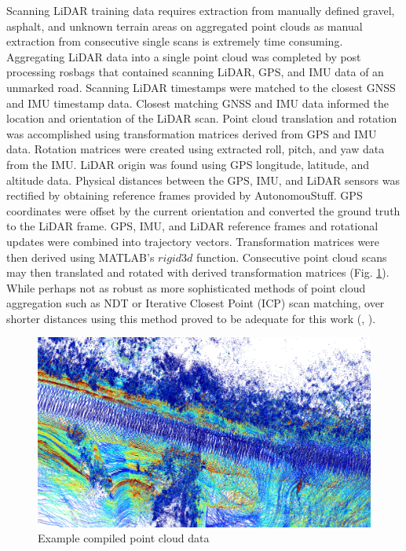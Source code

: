 \documentclass[numbered,pdftex]{ohio-etd}
\begin{document}
{{		{Scanning LiDAR training data requires extraction from manually defined gravel, asphalt, and unknown terrain areas on aggregated point clouds as manual extraction from consecutive single scans is extremely time consuming. Aggregating LiDAR data into a single point cloud was completed by post processing rosbags that contained scanning LiDAR, GPS, and IMU data of an unmarked road. Scanning LiDAR timestamps were matched to the closest GNSS and IMU timestamp data. Closest matching GNSS and IMU data informed the location and orientation of the LiDAR scan. Point cloud translation and rotation was accomplished using transformation matrices derived from GPS and IMU data. Rotation matrices were created using extracted roll, pitch, and yaw data from the IMU. LiDAR origin was found using GPS longitude, latitude, and altitude data. Physical distances between the GPS, IMU, and LiDAR sensors was rectified by obtaining reference frames provided by AutonomouStuff. GPS coordinates were offset by the current orientation and converted the ground truth to the LiDAR frame. GPS, IMU, and LiDAR reference frames and rotational updates were combined into trajectory vectors. Transformation matrices were then derived using MATLAB's $rigid3d$ function. Consecutive point cloud scans may then translated and rotated with derived transformation matrices (Fig. \ref{fig:Compiled_PCD}). While perhaps not as robust as more sophisticated methods of point cloud aggregation such as NDT or Iterative Closest Point (ICP) scan matching, over shorter distances using this method proved to be adequate for this work (\cite{wang_survey_2017}, \cite{chetverikov_robust_2005}).} 
		
		\begin{figure}[H]
			\centering
			\includegraphics[width=0.9\linewidth]{Defense_Images/combined_pcd_example}
			\caption[Compiled Point Cloud Data]{Example compiled point cloud data}
			\label{fig:Compiled_PCD}
		\end{figure}
	
}}
\end{document}
